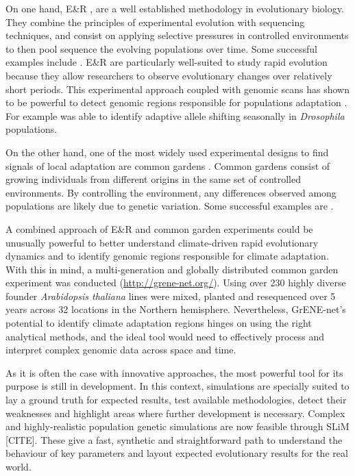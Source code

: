 \documentclass{article}
\begin{document}
On one hand, E\&R \citep{Schlotterer2015-yz}, are a well established methodology in evolutionary biology. They combine the principles of experimental evolution with sequencing techniques, and consist on applying selective pressures in controlled environments to then pool sequence the evolving populations over time. Some successful examples include \citep{Bergland2014-ud, Kapun2021-cd, Rudman2022-uc}. E\&R are particularly well-suited to study rapid evolution because they allow researchers to observe evolutionary changes over relatively short periods. This experimental approach coupled with genomic scans has shown to be powerful to detect genomic regions responsible for populations adaptation \citep{Vlachos2019-nf}. For example \citep{Bergland2014-ud} was able to identify adaptive allele shifting seasonally in \textit{Drosophila} populations. 

On the other hand, one of the most widely used experimental designs to find signals of local adaptation are common gardens \citep{Lee-Yaw2016-td}. Common gardens consist of growing individuals from different origins in the same set of controlled environments. By controlling the environment, any differences observed among populations are likely due to genetic variation. Some successful examples are \citep{Exposito-Alonso2019-hs, Lepais2014-za}. 

A combined approach of E\&R and common garden experiments could be unusually powerful to better understand climate-driven rapid evolutionary dynamics and to identify genomic regions responsible for climate adaptation. With this in mind, a multi-generation and globally distributed common garden experiment was conducted (\url{http://grene-net.org/}). Using over 230 highly diverse founder \textit{Arabidopsis thaliana} lines were mixed, planted and resequenced over 5 years across 32 locations in the Northern hemisphere. Nevertheless, GrENE-net's potential to identify climate adaptation regions hinges on using the right analytical methods, and the ideal tool would need to effectively process and interpret complex genomic data across space and time. 

As it is often the case with innovative approaches, the most powerful tool for its purpose is still in development. In this context, simulations are specially suited to lay a ground truth for expected results, test available methodologies, detect their weaknesses and highlight areas where further development is necessary.  Complex and highly-realistic population genetic simulations are now feasible through SLiM [CITE]. These  give a fast, synthetic and straightforward path to understand the behaviour of key parameters and layout expected evolutionary results for the real world. 
\end{document}
